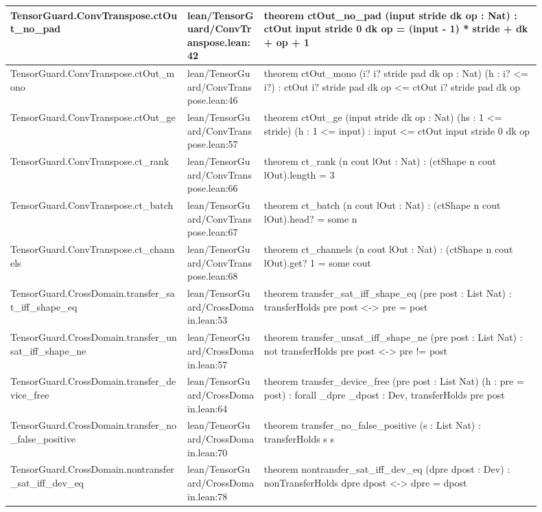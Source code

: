 \documentclass[10pt]{article}
\begin{document}
\begin{longtable}{|p{0.30\linewidth}|p{0.13\linewidth}|p{0.47\linewidth}|}
\hline
TensorGuard.ConvTranspose.ctOut\_no\_pad & lean/TensorGuard/ConvTranspose.lean:42 & theorem ctOut\_no\_pad (input stride dk op : Nat) : ctOut input stride 0 dk op = (input - 1) * stride + dk + op + 1 \\
\hline
TensorGuard.ConvTranspose.ctOut\_mono & lean/TensorGuard/ConvTranspose.lean:46 & theorem ctOut\_mono (i? i? stride pad dk op : Nat) (h : i? <= i?) : ctOut i? stride pad dk op <= ctOut i? stride pad dk op \\
\hline
TensorGuard.ConvTranspose.ctOut\_ge & lean/TensorGuard/ConvTranspose.lean:57 & theorem ctOut\_ge (input stride dk op : Nat) (hs : 1 <= stride) (h : 1 <= input) : input <= ctOut input stride 0 dk op \\
\hline
TensorGuard.ConvTranspose.ct\_rank & lean/TensorGuard/ConvTranspose.lean:66 & theorem ct\_rank (n cout lOut : Nat) : (ctShape n cout lOut).length = 3 \\
\hline
TensorGuard.ConvTranspose.ct\_batch & lean/TensorGuard/ConvTranspose.lean:67 & theorem ct\_batch (n cout lOut : Nat) : (ctShape n cout lOut).head? = some n \\
\hline
TensorGuard.ConvTranspose.ct\_channels & lean/TensorGuard/ConvTranspose.lean:68 & theorem ct\_channels (n cout lOut : Nat) : (ctShape n cout lOut).get? 1 = some cout \\
\hline
TensorGuard.CrossDomain.transfer\_sat\_iff\_shape\_eq & lean/TensorGuard/CrossDomain.lean:53 & theorem transfer\_sat\_iff\_shape\_eq (pre post : List Nat) : transferHolds pre post <-> pre = post \\
\hline
TensorGuard.CrossDomain.transfer\_unsat\_iff\_shape\_ne & lean/TensorGuard/CrossDomain.lean:57 & theorem transfer\_unsat\_iff\_shape\_ne (pre post : List Nat) : not  transferHolds pre post <-> pre != post \\
\hline
TensorGuard.CrossDomain.transfer\_device\_free & lean/TensorGuard/CrossDomain.lean:64 & theorem transfer\_device\_free (pre post : List Nat) (h : pre = post) : forall \_dpre \_dpost : Dev, transferHolds pre post \\
\hline
TensorGuard.CrossDomain.transfer\_no\_false\_positive & lean/TensorGuard/CrossDomain.lean:70 & theorem transfer\_no\_false\_positive (s : List Nat) : transferHolds s s \\
\hline
TensorGuard.CrossDomain.nontransfer\_sat\_iff\_dev\_eq & lean/TensorGuard/CrossDomain.lean:78 & theorem nontransfer\_sat\_iff\_dev\_eq (dpre dpost : Dev) : nonTransferHolds dpre dpost <-> dpre = dpost \\

\end{longtable}
\end{document}
